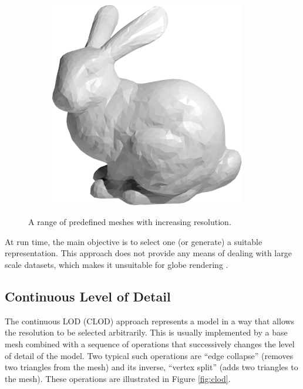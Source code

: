 \begin{figure}
\begin{subfigure}[b]{0.2\textwidth}
    \end{subfigure}
    ~ %
    \begin{subfigure}[b]{0.2\textwidth}
        \includegraphics[width=\textwidth]{figures/lod/decimation1.png}
    \end{subfigure}
    \caption{A range of predefined meshes with increasing resolution.}
    \label{fig:dlod}
\end{figure}

At run time, the main objective is to select one (or generate) a suitable representation. This approach does not provide any means of dealing with large scale datasets, which makes it unsuitable for globe rendering \cite{cozzi11}.


\subsection{Continuous Level of Detail}
The continuous LOD (CLOD) approach represents a model in a way that allows the resolution to be selected arbitrarily. This is usually implemented by a base mesh combined with a sequence of operations that successively changes the level of detail of the model. Two typical such operations are ``edge collapse'' (removes two triangles from the mesh) and its inverse, ``vertex split'' (adds two triangles to the mesh). These operations are illustrated in Figure \ref{fig:clod}.

